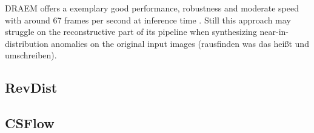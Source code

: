 DRAEM offers a exemplary good performance, robustness and moderate speed with around 67 frames per second at inference time \cite{liu2023simplenet}. Still this approach may struggle on the reconstructive 
part of its pipeline when synthesizing near-in-distribution anomalies on the original input images \cite{liu2024deep} (rausfinden was das heißt und umschreiben).


\subsection{RevDist}
\label{subsec:revdist}

\subsection{CSFlow}
\label{subsec:csflow}





